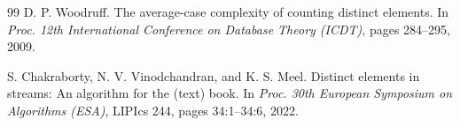 \documentclass[UTF8, 11pt, a4paper, linestretch=1.15]{ctexart}
\theoremstyle{zhstyle}
\begin{document}
\begin{thebibliography}{99}
		 D. P. Woodruff.
		The average-case complexity of counting distinct elements.
		In \emph{Proc. 12th International Conference on Database Theory (ICDT)},
		pages 284--295, 2009.
		
		 S. Chakraborty, N. V. Vinodchandran, and K. S. Meel.
		Distinct elements in streams: An algorithm for the (text) book.
		In \emph{Proc. 30th European Symposium on Algorithms (ESA)}, LIPIcs 244,
		pages 34:1--34:6, 2022.
	\end{thebibliography}
	
\end{document}
